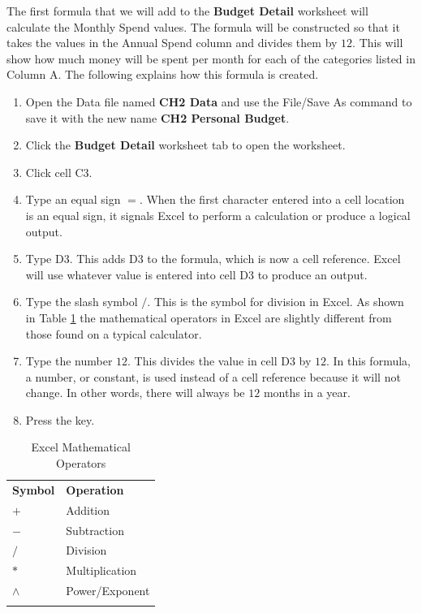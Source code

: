 The first formula that we will add to the \textbf{Budget Detail} worksheet will calculate the Monthly Spend values. The formula will be constructed so that it takes the values in the Annual Spend column and divides them by $ 12 $. This will show how much money will be spent per month for each of the categories listed in Column \textsf{A}. The following explains how this formula is created.

\begin{enumerate}
	\item Open the Data file named \textbf{CH2 Data} and use the File/Save As command to save it with the new name \textbf{CH2 Personal Budget}.
	\item Click the \textbf{Budget Detail} worksheet tab to open the worksheet.
	\item Click cell \textsf{C3}.
	\item Type an equal sign $ = $. When the first character entered into a cell location is an equal sign, it signals Excel to perform a calculation or produce a logical output.
	\item Type \textsf{D3}. This adds \textsf{D3} to the formula, which is now a cell reference. Excel will use whatever value is entered into cell \textsf{D3} to produce an output.
	\item Type the slash symbol $ / $. This is the symbol for division in Excel. As shown in Table \ref{02:tab02} the mathematical operators in Excel are slightly different from those found on a typical calculator.
	\item Type the number $ 12 $. This divides the value in cell \textsf{D3} by $ 12 $. In this formula, a number, or constant, is used instead of a cell reference because it will not change. In other words, there will always be $ 12 $ months in a year.
	\item Press the  key.
\end{enumerate}

\begin{longtable}{p{0.85in}p{2.8in}}
	\textbf{Symbol} & \textbf{Operation} \endhead
	\hline \\
	$ + $ & Addition\\
	$ - $ & Subtraction\\
	$ / $ & Division\\
	$ * $ & Multiplication\\
	$ \wedge $ & Power/Exponent\\
	\hline
	\caption{Excel Mathematical Operators}
	\label{02:tab02}
\end{longtable}


